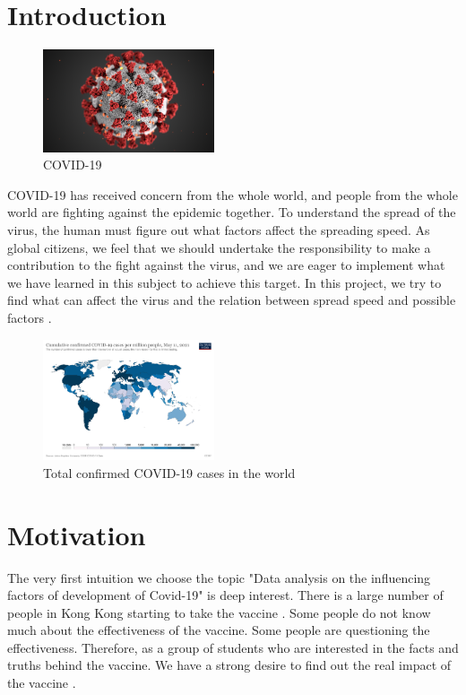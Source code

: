 \documentclass{article}
\begin{document}
\begin{multicols}{2}

\section{Introduction}

\begin{figure}[H]
    \centering
    \includegraphics[width=0.45\textwidth]{covid.png}
    \caption{COVID-19}
    \label{fig:graph0}
\end{figure}

COVID-19 has received concern from the whole world, and people from the whole world are fighting against the epidemic together. To understand the spread of the virus, the human must figure out what factors affect the spreading speed. As global citizens, we feel that we should undertake the responsibility to make a contribution to the fight against the virus, and we are eager to implement what we have learned in this subject to achieve this target. In this project, we try to find what can affect the virus and the relation between spread speed and possible factors \cite{roser2020coronavirus}.

\begin{figure}[H]
    \centering
    \includegraphics[width=0.45\textwidth]{totalconfirmed.png}
    \caption{Total confirmed COVID-19 cases in the world}
    \label{fig:graph1}
\end{figure}

\section{Motivation}
The very first intuition we choose the topic "Data analysis on the influencing factors of development of Covid-19" is deep interest. There is a large number of people in Kong Kong starting to take the vaccine \cite{tam2020impact}. Some people do not know much about the effectiveness of the vaccine. Some people are questioning the effectiveness. Therefore, as a group of students who are interested in the facts and truths behind the vaccine. We have a strong desire to find out the real impact of the vaccine \cite{kwok2020community}.


\end{multicols}
\end{document}
